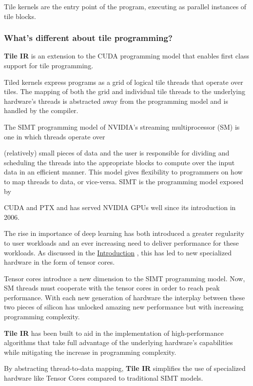 \documentclass{article}
\begin{document}
Tile kernels are the entry point of the program, executing as parallel instances of tile blocks.


\subsubsection{What's different about tile programming?}

\textbf{Tile IR} is an extension to the CUDA programming model that enables first class support for tile programming.

Tiled kernels express programs as a grid of logical tile threads that operate over tiles. The mapping of both the grid and individual tile threads to the underlying hardware's threads is abstracted away from the programming model and is handled by the compiler.


The SIMT programming model of NVIDIA's streaming multiprocessor (SM) is one in which threads operate over

(relatively) small pieces of data and the user is responsible for dividing and scheduling the threads into the appropriate blocks to compute over the input data in an efficient manner. This model gives flexibility to programmers on how to map threads to data, or vice-versa. SIMT is the programming model exposed by

CUDA and PTX and has served NVIDIA GPUs well since its introduction in 2006.


The rise in importance of deep learning has both introduced a greater regularity to user workloads and an ever increasing need to deliver performance for these workloads. As discussed in the \href{https://docs.nvidia.com/cuda/tile-ir/latest/sections/introduction.html#section-introduction}{Introduction} , this has led to new specialized hardware in the form of tensor cores.


Tensor cores introduce a new dimension to the SIMT programming model. Now, SM threads must cooperate with the tensor cores in order to reach peak performance. With each new generation of hardware the interplay between these two pieces of silicon has unlocked amazing new performance but with increasing programming complexity.


\textbf{Tile IR} has been built to aid in the implementation of high-performance algorithms that take full advantage of the underlying hardware's capabilities while mitigating the increase in programming complexity.


By abstracting thread-to-data mapping, \textbf{Tile IR} simplifies the use of specialized hardware like Tensor Cores compared to traditional SIMT models.
\end{document}
